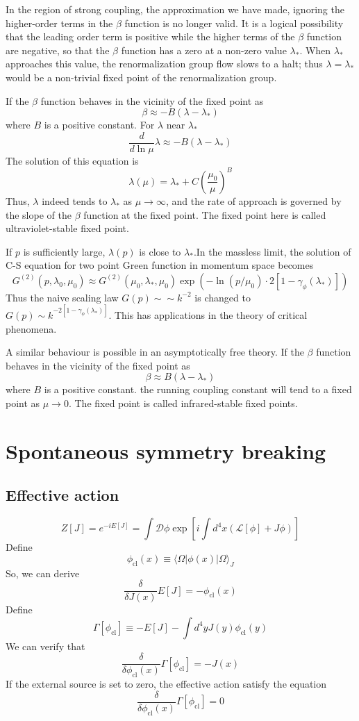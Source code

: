 In the region of strong coupling, the approximation we have made, ignoring the higher-order terms in the $\beta$ function is no longer valid. It is a logical possibility that the leading order term is positive while the higher terms of the $\beta$ function are negative, so that the $\beta$ function has a zero at a non-zero value $\lambda_*$. When $\lambda_*$ approaches this value, the renormalization group flow slows to a halt; thus $\lambda = \lambda_*$ would be a non-trivial fixed point of the renormalization group. 

If the $\beta$ function behaves in the vicinity of the fixed point as 
\[\beta \approx -B(\lambda - \lambda_*)\] 
where $B$ is a positive constant. For $\lambda$ near $\lambda_*$ 
\[\frac{d}{d\ln \mu} \lambda \approx -B(\lambda-\lambda_*)\]
The solution of this equation is
\[\lambda(\mu) = \lambda_* + C(\frac{\mu_0}{\mu})^B\]
Thus, $\lambda$ indeed tends to $\lambda_*$ as $\mu \to \infty$, and the rate of approach is governed by the slope of the $\beta$ function at the fixed point. The fixed point here is called ultraviolet-stable fixed point. 

If $p$ is sufficiently large, $\lambda(p)$ is close to $\lambda_*$.In the massless limit, the solution of C-S equation for two point Green function in momentum space becomes
\[G^{(2)}(p,\lambda_0,\mu_0) \approx G^{(2)}(\mu_0,\lambda_*,\mu_0)\exp \left (- \ln(p/\mu_0) \cdot 2[1-\gamma_{\phi}(\lambda_*)] \right )\]
Thus the naive scaling law $G(p) \sim \sim k^{-2}$ is changed to $G(p) \sim k^{-2[1-\gamma_{\phi}(\lambda_*)]}$. This has applications in the theory of critical phenomena.

A similar behaviour is possible in an asymptotically free theory. If the $\beta$ function behaves in the vicinity of the fixed point as 
\[\beta \approx B(\lambda - \lambda_*)\] 
where $B$ is a positive constant.
the running coupling constant will tend to a fixed point as $\mu \to 0$.  The fixed point is called infrared-stable fixed points. 

\section{Spontaneous symmetry breaking}
\subsection{Effective action}
\[Z[J] = e^{-iE[J]} = \int \mathcal{D} \phi \exp\left[ i\int d^4x (\mathcal{L}[\phi] + J \phi) \right]\]
Define 
\[\phi_{\mathrm{cl}} (x) \equiv \langle \Omega | \phi(x) | \Omega \rangle_{J}\]
So, we can derive
\[\frac{\delta}{\delta J(x)} E[J] = - \phi_{\mathrm{cl}}(x)\]
Define
\[\Gamma[\phi_{\mathrm{cl}}] \equiv -E[J] - \int d^4y J(y) \phi_{\mathrm{cl}}(y)\]
We can verify that
\[\frac{\delta}{\delta \phi_{\mathrm{cl}}(x)} \Gamma[\phi_{\mathrm{cl}}] = -J(x)\]
If the external source is set to zero, the effective action satisfy the equation
\[\frac{\delta}{\delta \phi_{\mathrm{cl}}(x)} \Gamma[\phi_{\mathrm{cl}}] = 0\]

